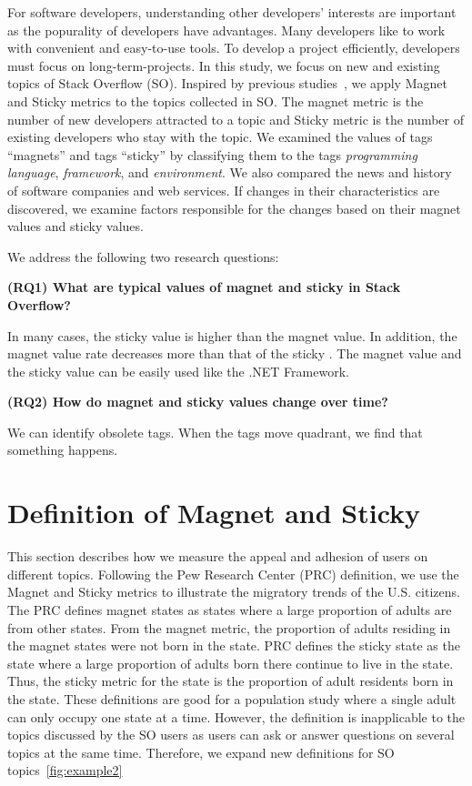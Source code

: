 \documentclass[english,preprint,JIP,technote]{ipsj}
\begin{document}
For software developers, understanding other developers’ interests are important as the popurality of developers have advantages. Many developers like to work with convenient and easy-to-use tools. To develop a project efficiently, developers must focus on long-term-projects. In this study, we focus on new and existing topics of Stack Overflow (SO). Inspired by previous studies~\cite{yamashita2016magnet}, we apply Magnet and Sticky metrics to the topics collected in SO. 
The magnet metric is the number of new developers attracted to a topic and Sticky metric is the number of existing developers who stay with the topic. 
We examined the values of tags “magnets” and tags “sticky” by classifying them to the tags \emph{programming language}, \emph{framework}, and \emph{environment}. We also compared the news and history of software  companies and web services. If changes in their characteristics are discovered, we examine factors responsible for the changes based on their magnet values and sticky values. 

We address the following two research questions:

\noindent \textbf{(RQ1) What are typical values of magnet and sticky in Stack Overflow?}\par
In many cases, the sticky value is higher than the magnet value. In addition, the magnet value rate decreases more than that of the sticky . The magnet value and the sticky value can be easily used like the .NET Framework.

\noindent \textbf{(RQ2) How do magnet and sticky values change over time?}\par
We can identify obsolete tags. When the tags move quadrant, we find that something happens.


\section{Definition of Magnet and Sticky} \label{magnet}
This section describes how we measure the appeal and adhesion of users on different topics. Following the Pew Research Center (PRC) definition, we use the Magnet and Sticky metrics to illustrate the migratory trends of the U.S. citizens. The PRC defines magnet states as states where a large proportion of adults are from other states. From the magnet metric, the proportion of adults residing in the magnet states were not born in the state. PRC defines the sticky state as the state where a large proportion of adults born there continue to live in the state. Thus, the sticky metric for the state is the proportion of adult residents born in the state. These definitions are good for a population study where a single adult can only occupy one state at a time. However, the definition is inapplicable to the topics discussed by the SO users as users can ask or answer questions on several topics at the same time. Therefore, we expand new definitions for SO topics~\ref{fig:example2}
\end{document}
